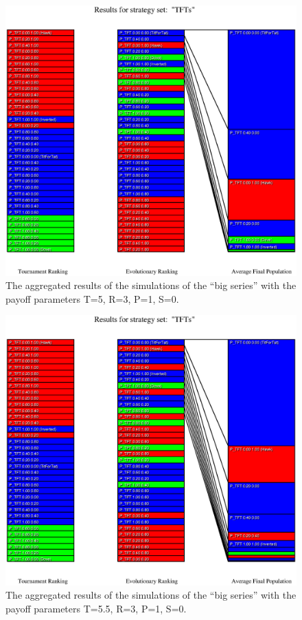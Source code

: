 \begin{figure}
\begin{center}
\includegraphics[width=20cm]{tables/TFTs_P5.eps}
\caption{\label{TFTs_P5} The aggregated results of the
simulations of the ``big series'' with the payoff parameters T=5, R=3, P=1,
S=0.}
\end{center}
\end{figure}

\begin{figure}
\begin{center}
\includegraphics[width=20cm]{tables/TFTs_P5.5.eps}
\caption{\label{TFTs_P55} The aggregated results of the
simulations of the ``big series'' with the payoff parameters T=5.5, R=3, P=1,
S=0.}
\end{center}
\end{figure}

